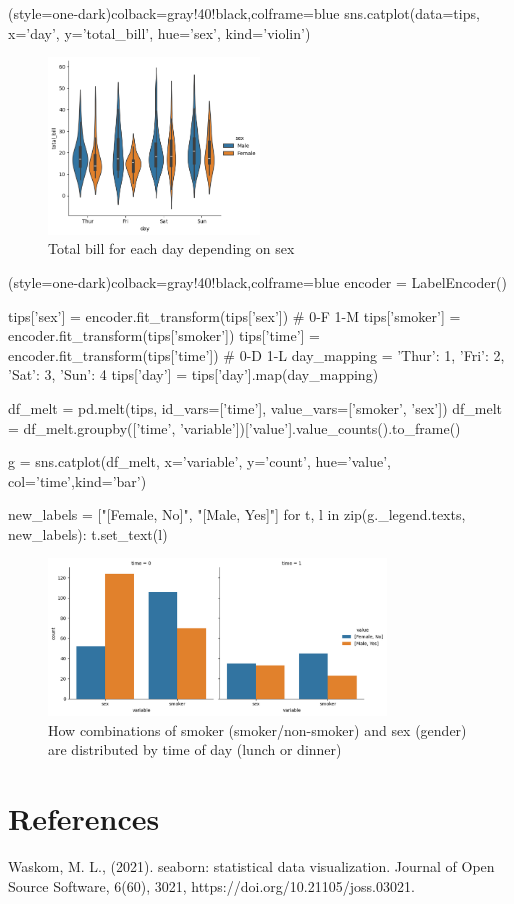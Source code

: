 \documentclass[10pt]{extarticle}
\begin{document}
\begin{python}[tips](style=one-dark){colback=gray!40!black,colframe=blue}
sns.catplot(data=tips, x='day', y='total_bill', hue='sex', kind='violin')
\end{python}

\begin{figure}[H]
    \centering
    \includegraphics[width=0.5\textwidth]{img/catplot_4.png} 
    \caption{Total bill for each day depending on sex}
    \label{fig:imagen}
\end{figure}

\begin{python}[tips](style=one-dark){colback=gray!40!black,colframe=blue}
encoder = LabelEncoder()

tips['sex'] = encoder.fit_transform(tips['sex']) # 0-F 1-M
tips['smoker'] = encoder.fit_transform(tips['smoker'])
tips['time'] = encoder.fit_transform(tips['time']) # 0-D 1-L
day_mapping = {'Thur': 1, 'Fri': 2, 'Sat': 3, 'Sun': 4}
tips['day'] = tips['day'].map(day_mapping)

df_melt = pd.melt(tips, id_vars=['time'], value_vars=['smoker', 'sex'])
df_melt = df_melt.groupby(['time', 'variable'])['value'].value_counts().to_frame()

g = sns.catplot(df_melt, x='variable', y='count', hue='value',
                col='time',kind='bar')

new_labels = ["[Female, No]", "[Male, Yes]"]
for t, l in zip(g._legend.texts, new_labels):
    t.set_text(l)
\end{python}

\begin{figure}[H]
    \centering
    \includegraphics[width=0.8\textwidth]{img/catplot_5.png} 
    \caption{How combinations of smoker (smoker/non-smoker) and sex (gender) are distributed by time of day (lunch or dinner)}
    \label{fig:imagen}
\end{figure}

\section{References}

Waskom, M. L., (2021). seaborn: statistical data visualization. Journal of Open Source Software, 6(60), 3021, https://doi.org/10.21105/joss.03021.
\end{document}
